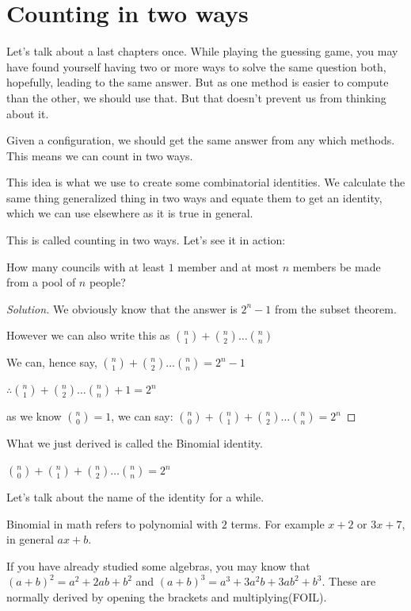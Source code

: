 \section{Counting in two ways}
Let's talk about a last chapters once. While playing the guessing game, 
you may have found yourself having two or more ways to solve the same question both, 
hopefully, leading to the same answer. But as one method is easier to compute than the 
other, we should use that. But that doesn't prevent us from thinking about it.\par
Given a configuration, we should get the same answer from any which methods. This 
means we can count in two ways.\par
This idea is what we use to create some combinatorial identities. We calculate the 
same thing generalized thing in two ways and equate them to get an identity, which 
we can use elsewhere as it is true in general.\par
This is called counting in two ways. Let's see it in action:
\begin{example}
    How many councils with at least $1$ member and at most $n$ members be made 
    from a pool of $n$ people?
\end{example}
\begin{proof}
    [Solution]
    We obviously know that the answer is $2^n - 1$ from the subset theorem. \par
    However we can also write this as $\binom{n}{1} + \binom{n}{2} \dots \binom{n}{n}$\par
    We can, hence say, $\binom{n}{1} + \binom{n}{2} \dots \binom{n}{n}= 2^n -1$ \par
    $\therefore \binom{n}{1} + \binom{n}{2} \dots \binom{n}{n} +1 = 2^n$ \par
    as we know $\binom{n}{0}=1$, we can say: $\binom{n}{0} + \binom{n}{1} + \binom{n}{2} 
    \dots \binom{n}{n} = 2^n$
\end{proof}
What we just derived is called the Binomial identity.
\begin{theorem}
    $\binom{n}{0} + \binom{n}{1} + \binom{n}{2} \dots \binom{n}{n} = 2^n$
\end{theorem}
Let's talk about the name of the identity for a while.\par
Binomial in math refers to polynomial with $2$ terms. For example $x+2$ or $3x+7$, in general $ax+b$.\par
If you have already studied some algebras, you may know that $(a+b)^2=a^2+2ab+b^2$ 
and $(a+b)^3=a^3+3a^2b+3ab^2+b^3$. These are normally derived by opening the brackets and multiplying(FOIL).\par
